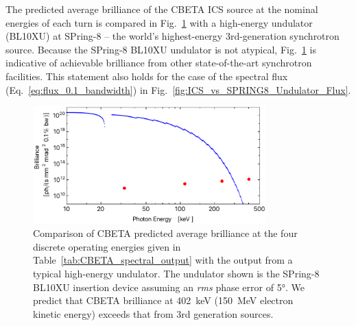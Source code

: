 \documentclass[../main.tex]{subfiles}
\begin{document}
The predicted average brilliance of the CBETA ICS source at the nominal energies of each turn is compared in Fig.~\ref{fig:ICS_vs_SPRING8_Undulator_Brilliance} with a high-energy undulator (BL10XU) at SPring-8 -- the world's highest-energy 3rd-generation synchrotron source. Because the SPring-8 BL10XU undulator is not atypical, Fig.~\ref{fig:ICS_vs_SPRING8_Undulator_Brilliance} is indicative of achievable brilliance from other state-of-the-art synchrotron facilities. This statement also holds for the case of the spectral flux (Eq.~\ref{eq:flux_0.1_bandwidth}) in Fig.~\ref{fig:ICS_vs_SPRING8_Undulator_Flux}.
\begin{figure}[!h]
\centering
\includegraphics[width=0.8\textwidth]{Figures/CBETA_Inverse_Compton_Source_Design/spring8bl10brillianceplot.pdf}
\caption{Comparison of CBETA predicted average brilliance at the four discrete operating energies given in Table~\ref{tab:CBETA_spectral_output} with the output from a typical high-energy undulator. The undulator shown is the SPring-8 BL10XU insertion device \cite{spring8beamlines} assuming an \textit{rms} phase error of 5\si{\degree}. We predict that CBETA brilliance at 402~\si{\kilo\electronvolt} (150~\si{\mega\electronvolt} electron kinetic energy) exceeds that from 3rd generation sources.}
\label{fig:ICS_vs_SPRING8_Undulator_Brilliance}
\end{figure}
\end{document}
